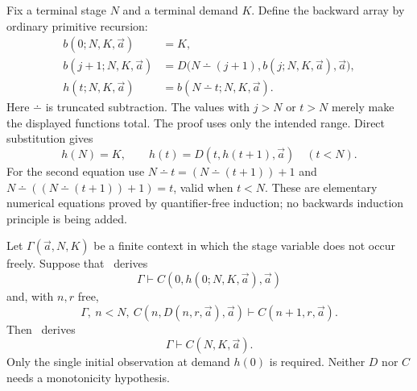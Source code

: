 Fix a terminal stage $N$ and a terminal demand $K$.  Define the backward
array by ordinary primitive recursion:
\begin{align}
 b(0;N,K,\vec a)&=K,\nonumber\\
 b(j+1;N,K,\vec a)
   &=D\bigl(N\mathbin{\dotminus}(j+1),b(j;N,K,\vec a),\vec a\bigr),
   \label{eq:backward-array}\\
 h(t;N,K,\vec a)&=b(N\mathbin{\dotminus}t;N,K,\vec a).
   \label{eq:backward-horizon}
\end{align}
Here $\dotminus$ is truncated subtraction.  The values with $j>N$ or
$t>N$ merely make the displayed functions total.  The proof uses only
the intended range.  Direct substitution gives
\begin{equation}\label{eq:backward-schedule-laws}
 h(N)=K,\qquad h(t)=D(t,h(t+1),\vec a)\quad(t<N).
\end{equation}
For the second equation use
$N\dotminus t=(N\dotminus(t+1))+1$ and
$N\dotminus((N\dotminus(t+1))+1)=t$, valid when $t<N$.
These are elementary numerical equations proved by quantifier-free
induction; no backwards induction principle is being added.

\begin{theorem}
\label{thm:backward-transfer}
Let $\Gamma(\vec a,N,K)$ be a finite context in which the stage variable
does not occur freely.  Suppose that \ipra\ derives
\[
 \Gamma\vdash C(0,h(0;N,K,\vec a),\vec a)
\]
and, with $n,r$ free,
\[
 \Gamma,\ n<N,\ C(n,D(n,r,\vec a),\vec a)
       \vdash C(n+1,r,\vec a).
\]
Then \ipra\ derives
\[
                 \Gamma\vdash C(N,K,\vec a).
\]
Only the single initial observation at demand $h(0)$ is required.  Neither
$D$ nor $C$ needs a monotonicity hypothesis.
\end{theorem}

